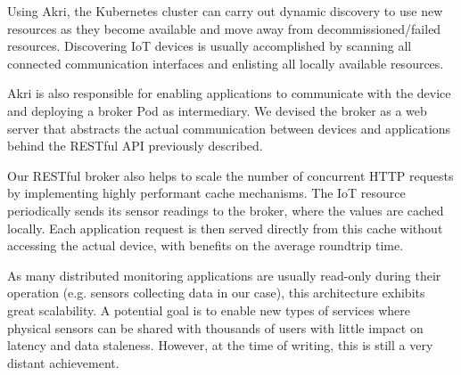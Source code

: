 
Using Akri, the Kubernetes cluster can carry out dynamic discovery to use new resources as they become available and move away from decommissioned/failed resources. Discovering IoT devices is usually accomplished by scanning all connected communication interfaces and enlisting all locally available resources.

Akri is also responsible for enabling applications to communicate with the device and deploying a broker Pod as intermediary. We devised the broker as a web server that abstracts the actual communication between devices and applications behind the RESTful API previously described.



Our RESTful broker also helps to scale the number of concurrent HTTP requests by implementing highly performant cache mechanisms. The IoT resource periodically sends its sensor readings to the broker, where the values are cached locally. Each application request is then served directly from this cache without accessing the actual device, with benefits on the average roundtrip time.


As many distributed monitoring applications are usually read-only during their operation (e.g. sensors collecting data in our case), this architecture exhibits great scalability. A potential goal is to enable new types of services where physical sensors can be shared with thousands of users with little impact on latency and data staleness. However, at the time of writing, this is still a very distant achievement.

